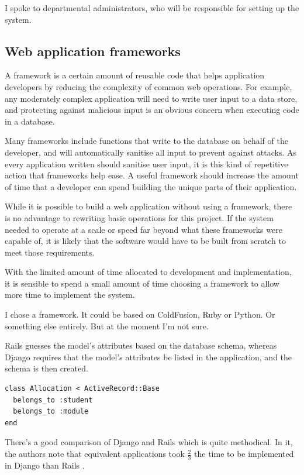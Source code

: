 \documentclass[]{scrartcl}
\begin{document}
I spoke to departmental administrators, who will be responsible for setting up the system.

\subsection{Web application frameworks}

A framework is a certain amount of reusable code that helps application developers by reducing the complexity of common web operations. For example, any moderately complex application will need to write user input to a data store, and protecting against malicious input is an obvious concern when executing code in a database.

Many frameworks include functions that write to the database on behalf of the developer, and will automatically sanitise all input to prevent against attacks. As every application written should sanitise user input, it is this kind of repetitive action that frameworks help ease. A useful framework should increase the amount of time that a developer can spend building the unique parts of their application.

While it is possible to build a web application without using a framework, there is no advantage to rewriting basic operations for this project. If the system needed to operate at a scale or speed far beyond what these frameworks were capable of, it is likely that the software would have to be built from scratch to meet those requirements.

With the limited amount of time allocated to development and implementation, it is sensible to spend a small amount of time choosing a framework to allow more time to implement the system.


I chose a framework. It could be based on ColdFusion, Ruby or Python. Or something else entirely. But at the moment I'm not sure.

Rails guesses the model's attributes based on the database schema, whereas Django requires that the model's attributes be listed in the application, and the schema is then created.

\begin{lstlisting}
class Allocation < ActiveRecord::Base
  belongs_to :student
  belongs_to :module
end
\end{lstlisting}

There's a good comparison of Django and Rails which is quite methodical. In it, the authors note that equivalent applications took $\frac{2}{3}$ the time to be implemented in Django than Rails \cite{RailsDjangoComparison_2007}.
\end{document}
